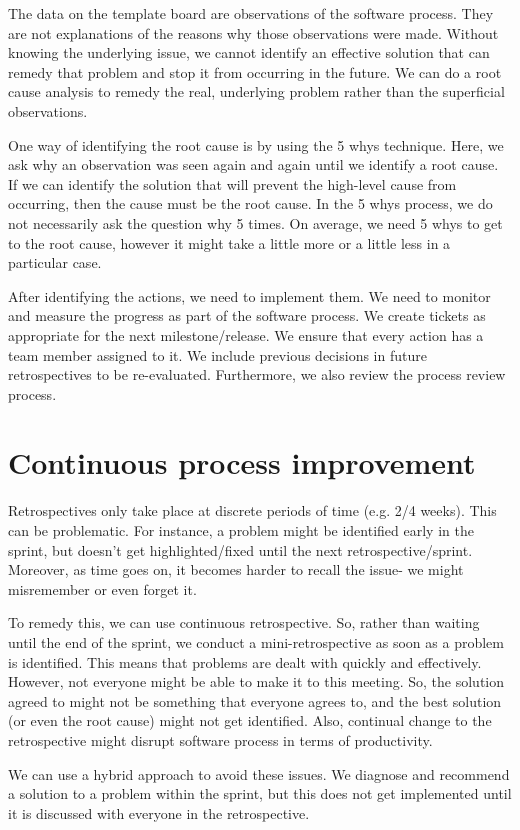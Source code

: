 \documentclass[a4paper, openany]{memoir}
\begin{document}
The data on the template board are observations of the software process. They are not explanations of the reasons why those observations were made. Without knowing the underlying issue, we cannot identify an effective solution that can remedy that problem and stop it from occurring in the future. We can do a root cause analysis to remedy the real, underlying problem rather than the superficial observations.

One way of identifying the root cause is by using the 5 whys technique. Here, we ask why an observation was seen again and again until we identify a root cause. If we can identify the solution that will prevent the high-level cause from occurring, then the cause must be the root cause. In the 5 whys process, we do not necessarily ask the question why 5 times. On average, we need 5 whys to get to the root cause, however it might take a little more or a little less in a particular case.

After identifying the actions, we need to implement them. We need to monitor and measure the progress as part of the software process. We create tickets as appropriate for the next milestone/release. We ensure that every action has a team member assigned to it. We include previous decisions in future retrospectives to be re-evaluated. Furthermore, we also review the process review process.

\section{Continuous process improvement}
Retrospectives only take place at discrete periods of time (e.g. 2/4 weeks). This can be problematic. For instance, a problem might be identified early in the sprint, but doesn't get highlighted/fixed until the next retrospective/sprint. Moreover, as time goes on, it becomes harder to recall the issue- we might misremember or even forget it.

To remedy this, we can use continuous retrospective. So, rather than waiting until the end of the sprint, we conduct a mini-retrospective as soon as a problem is identified. This means that problems are dealt with quickly and effectively. However, not everyone might be able to make it to this meeting. So, the solution agreed to might not be something that everyone agrees to, and the best solution (or even the root cause) might not get identified. Also, continual change to the retrospective might disrupt software process in terms of productivity.

We can use a hybrid approach to avoid these issues. We diagnose and recommend a solution to a problem within the sprint, but this does not get implemented until it is discussed with everyone in the retrospective.
\end{document}
